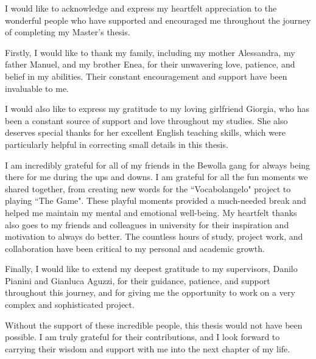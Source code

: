 \begin{acknowledgements} %
I would like to acknowledge and express my heartfelt appreciation to the wonderful people who have supported and encouraged me throughout the journey of completing my Master's thesis.\newline

Firstly, I would like to thank my family, including my mother Alessandra, my father Manuel, and my brother Enea, for their unwavering love, patience, and belief in my abilities. Their constant encouragement and support have been invaluable to me.\newline

I would also like to express my gratitude to my loving girlfriend Giorgia, who has been a constant source of support and love throughout my studies. She also deserves special thanks for her excellent English teaching skills, which were particularly helpful in correcting small details in this thesis.\newline

I am incredibly grateful for all of my friends in the Bewolla gang for always being there for me during the ups and downs. I am grateful for all the fun moments we shared together, from creating new words for the ``Vocabolangelo" project to playing ``The Game". These playful moments provided a much-needed break and helped me maintain my mental and emotional well-being. My heartfelt thanks also goes to my friends and colleagues in university for their inspiration and motivation to always do better. The countless hours of study, project work, and collaboration have been critical to my personal and academic growth.\newline

Finally, I would like to extend my deepest gratitude to my supervisors, Danilo Pianini and Gianluca Aguzzi, for their guidance, patience, and support throughout this journey, and for giving me the opportunity to work on a very complex and
sophisticated project.\newline

Without the support of these incredible people, this thesis would not have been possible. I am truly grateful for their contributions, and I look forward to carrying their wisdom and support with me into the next chapter of my life.
\end{acknowledgements}
